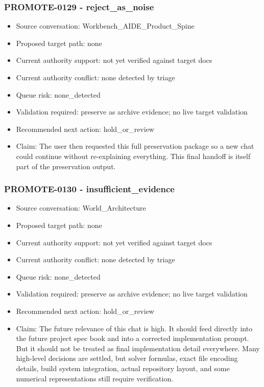 \documentclass[11pt,a4paper]{report}
\begin{document}
\subsubsection{PROMOTE-0129 - reject\_as\_noise}

\begin{itemize}
\item Source conversation: Workbench\_AIDE\_Product\_Spine
\item Proposed target path: none
\item Current authority support: not yet verified against target docs
\item Current authority conflict: none detected by triage
\item Queue risk: none\_detected
\item Validation required: preserve as archive evidence; no live target validation
\item Recommended next action: hold\_or\_review
\item Claim: The user then requested this full preservation package so a new chat could continue without re-explaining everything. This final handoff is itself part of the preservation output.
\end{itemize}

\subsubsection{PROMOTE-0130 - insufficient\_evidence}

\begin{itemize}
\item Source conversation: World\_Architecture
\item Proposed target path: none
\item Current authority support: not yet verified against target docs
\item Current authority conflict: none detected by triage
\item Queue risk: none\_detected
\item Validation required: preserve as archive evidence; no live target validation
\item Recommended next action: hold\_or\_review
\item Claim: The future relevance of this chat is high. It should feed directly into the future project spec book and into a corrected implementation prompt. But it should not be treated as final implementation detail everywhere. Many high-level decisions are settled, but solver formulas, exact file encoding details, build system integration, actual repository layout, and some numerical representations still require verification.
\end{itemize}
\end{document}
